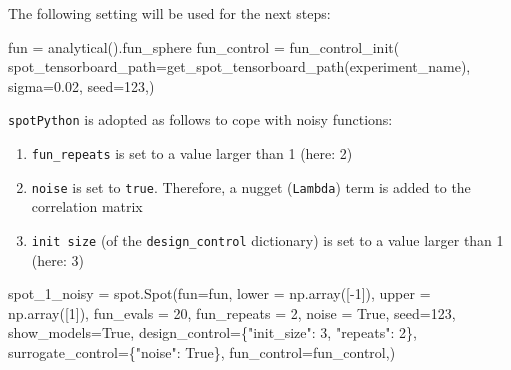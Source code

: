 \documentclass[
  letterpaper,
  DIV=11,
  numbers=noendperiod]{scrreprt}
\newenvironment{Shaded}{\begin{snugshade}}{\end{snugshade}}
\newcommand{\DecValTok}[1]{\textcolor[rgb]{0.68,0.00,0.00}{#1}}
\newcommand{\FloatTok}[1]{\textcolor[rgb]{0.68,0.00,0.00}{#1}}
\newcommand{\NormalTok}[1]{\textcolor[rgb]{0.00,0.23,0.31}{#1}}
\newcommand{\OperatorTok}[1]{\textcolor[rgb]{0.37,0.37,0.37}{#1}}
\newcommand{\StringTok}[1]{\textcolor[rgb]{0.13,0.47,0.30}{#1}}
\newcommand{\VariableTok}[1]{\textcolor[rgb]{0.07,0.07,0.07}{#1}}
\providecommand{\tightlist}{%
  \setlength{\itemsep}{0pt}\setlength{\parskip}{0pt}}\usepackage{longtable,booktabs,array}
\begin{document}
The following setting will be used for the next steps:

\begin{Shaded}
\begin{Highlighting}[]
\NormalTok{fun }\OperatorTok{=}\NormalTok{ analytical().fun\_sphere}
\NormalTok{fun\_control }\OperatorTok{=}\NormalTok{ fun\_control\_init(}
\NormalTok{    spot\_tensorboard\_path}\OperatorTok{=}\NormalTok{get\_spot\_tensorboard\_path(experiment\_name),}
\NormalTok{    sigma}\OperatorTok{=}\FloatTok{0.02}\NormalTok{,}
\NormalTok{    seed}\OperatorTok{=}\DecValTok{123}\NormalTok{,)}
\end{Highlighting}
\end{Shaded}

\texttt{spotPython} is adopted as follows to cope with noisy functions:

\begin{enumerate}
\def\labelenumi{\arabic{enumi}.}
\tightlist
\item
  \texttt{fun\_repeats} is set to a value larger than 1 (here: 2)
\item
  \texttt{noise} is set to \texttt{true}. Therefore, a nugget
  (\texttt{Lambda}) term is added to the correlation matrix
\item
  \texttt{init\ size} (of the \texttt{design\_control} dictionary) is
  set to a value larger than 1 (here: 3)
\end{enumerate}

\begin{Shaded}
\begin{Highlighting}[]
\NormalTok{spot\_1\_noisy }\OperatorTok{=}\NormalTok{ spot.Spot(fun}\OperatorTok{=}\NormalTok{fun,}
\NormalTok{                   lower }\OperatorTok{=}\NormalTok{ np.array([}\OperatorTok{{-}}\DecValTok{1}\NormalTok{]),}
\NormalTok{                   upper }\OperatorTok{=}\NormalTok{ np.array([}\DecValTok{1}\NormalTok{]),}
\NormalTok{                   fun\_evals }\OperatorTok{=} \DecValTok{20}\NormalTok{,}
\NormalTok{                   fun\_repeats }\OperatorTok{=} \DecValTok{2}\NormalTok{,}
\NormalTok{                   noise }\OperatorTok{=} \VariableTok{True}\NormalTok{,}
\NormalTok{                   seed}\OperatorTok{=}\DecValTok{123}\NormalTok{,}
\NormalTok{                   show\_models}\OperatorTok{=}\VariableTok{True}\NormalTok{,}
\NormalTok{                   design\_control}\OperatorTok{=}\NormalTok{\{}\StringTok{"init\_size"}\NormalTok{: }\DecValTok{3}\NormalTok{,}
                                   \StringTok{"repeats"}\NormalTok{: }\DecValTok{2}\NormalTok{\},}
\NormalTok{                   surrogate\_control}\OperatorTok{=}\NormalTok{\{}\StringTok{"noise"}\NormalTok{: }\VariableTok{True}\NormalTok{\},}
\NormalTok{                   fun\_control}\OperatorTok{=}\NormalTok{fun\_control,)}
\end{Highlighting}
\end{Shaded}
\end{document}
